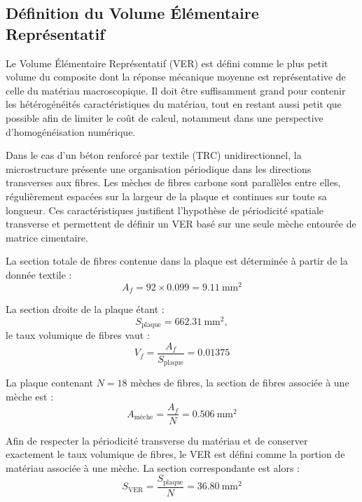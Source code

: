 \documentclass{rapportECL}
\begin{document}
\newpage
\subsection{Définition du Volume Élémentaire Représentatif}

Le Volume Élémentaire Représentatif (VER) est défini comme le plus petit volume du composite dont la réponse mécanique moyenne est représentative de celle du matériau macroscopique. Il doit être suffisamment grand pour contenir les hétérogénéités caractéristiques du matériau, tout en restant aussi petit que possible afin de limiter le coût de calcul, notamment dans une perspective d’homogénéisation numérique.

Dans le cas d’un béton renforcé par textile (TRC) unidirectionnel, la microstructure présente une organisation périodique dans les directions transverses aux fibres. Les mèches de fibres carbone sont parallèles entre elles, régulièrement espacées sur la largeur de la plaque et continues sur toute sa longueur. Ces caractéristiques justifient l’hypothèse de périodicité spatiale transverse et permettent de définir un VER basé sur une seule mèche entourée de matrice cimentaire.

La section totale de fibres contenue dans la plaque est déterminée à partir de la donnée textile :
\begin{equation}
A_f = 92 \times 0.099 = 9.11 \ \text{mm}^2
\end{equation}

La section droite de la plaque étant :
\begin{equation}
S_{\text{plaque}} = 662.31 \ \text{mm}^2,
\end{equation}
le taux volumique de fibres vaut :
\begin{equation}
V_f = \frac{A_f}{S_{\text{plaque}}} = 0.01375
\end{equation}

La plaque contenant $N = 18$ mèches de fibres, la section de fibres associée à une mèche est :
\begin{equation}
A_{\text{m\`eche}} = \frac{A_f}{N} = 0.506 \ \text{mm}^2
\end{equation}

Afin de respecter la périodicité transverse du matériau et de conserver exactement le taux volumique de fibres, le VER est défini comme la portion de matériau associée à une mèche. La section correspondante est alors :
\begin{equation}
S_{\text{VER}} = \frac{S_{\text{plaque}}}{N} = 36.80 \ \text{mm}^2
\end{equation}
\end{document}
